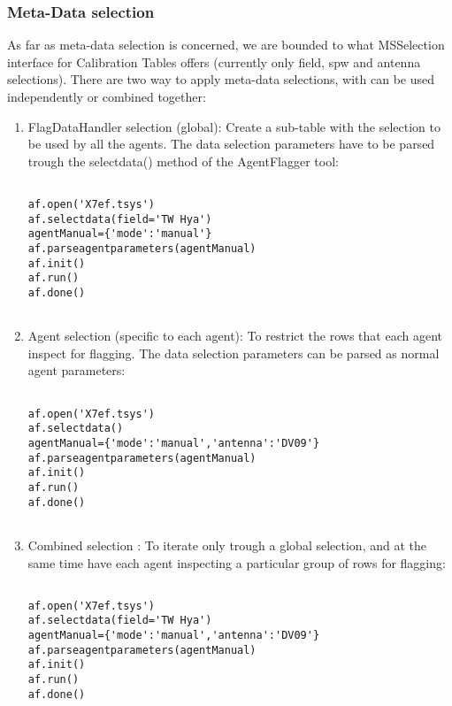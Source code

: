 \subsubsection{Meta-Data selection}

As far as meta-data selection is concerned, we are bounded to what MSSelection
interface for Calibration Tables offers (currently only field, spw and antenna
selections). There are two way to apply meta-data selections, with can be used
independently or combined together:

\begin{enumerate}

\item FlagDataHandler selection (global): Create a sub-table with the selection
to be used by all the agents. The data selection parameters have to be parsed
trough the selectdata() method of the AgentFlagger tool:

\begin{verbatim}

af.open('X7ef.tsys')
af.selectdata(field='TW Hya')
agentManual={'mode':'manual'}
af.parseagentparameters(agentManual)
af.init()
af.run()
af.done() 
		
\end{verbatim}

\item Agent selection (specific to each agent): To restrict the rows that each
agent inspect for flagging. The data selection parameters can be parsed as
normal agent parameters:

\begin{verbatim}

af.open('X7ef.tsys')
af.selectdata()
agentManual={'mode':'manual','antenna':'DV09'}
af.parseagentparameters(agentManual)
af.init()
af.run()
af.done() 
		
\end{verbatim}

\item Combined selection : To iterate only trough a global selection, and at the
same time have each agent inspecting a particular group of rows for flagging:

\begin{verbatim}

af.open('X7ef.tsys')
af.selectdata(field='TW Hya')
agentManual={'mode':'manual','antenna':'DV09'}
af.parseagentparameters(agentManual)
af.init()
af.run()
af.done() 
		 
\end{verbatim}

\end{enumerate}

